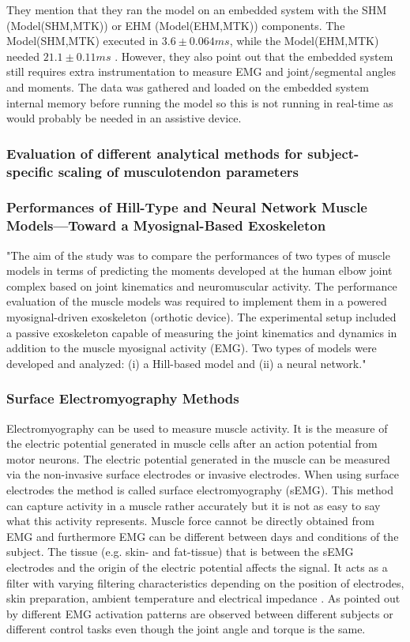They mention that they ran the model on an embedded system with the SHM (Model(SHM,MTK)) or EHM (Model(EHM,MTK)) components. 
The Model(SHM,MTK) executed in $3.6 \pm 0.064 ms$, while the Model(EHM,MTK) needed $21.1 \pm 0.11 ms$ \cite[p. 8]{Sartori2012}.
However, they also point out that the embedded system still requires extra instrumentation to measure EMG and joint/segmental angles and moments. The data was gathered and loaded on the embedded system internal memory before running the model so this is not running in real-time as would probably be needed in an assistive device.

\subsubsection{Evaluation of different analytical methods for subject-specific scaling of musculotendon parameters}

\subsubsection{Performances of Hill-Type and Neural Network Muscle
Models—Toward a Myosignal-Based Exoskeleton}

"The aim of the study was to compare the performances of two types of muscle models in terms of predicting the moments developed at the human elbow joint complex based on joint kinematics and neuromuscular activity. The performance evaluation of the muscle models was required to implement them in a powered myosignal-driven exoskeleton (orthotic device). The experimental setup included a passive exoskeleton capable of measuring the joint kinematics and dynamics in addition to the muscle myosignal activity (EMG). Two types of models were developed and analyzed: (i) a Hill-based model and (ii) a neural network." \cite[p. 1]{Rosen1999}

\subsubsection{Surface Electromyography Methods}
Electromyography can be used to measure muscle activity. 
It is the measure of the electric potential generated in muscle cells after an action potential from motor neurons. 
The electric potential generated in the muscle can be measured via the non-invasive surface electrodes or invasive electrodes. 
When using surface electrodes the method is called surface electromyography (sEMG). 
This method can capture activity in a muscle rather accurately but it is not as easy to say what this activity represents. 
Muscle force cannot be directly obtained from EMG and furthermore EMG can be different between days and conditions of the subject. 
The tissue (e.g. skin- and fat-tissue) that is between the sEMG electrodes and the origin of the electric potential affects the signal. 
It acts as a filter with varying filtering characteristics depending on the position of electrodes, skin preparation, ambient temperature and electrical impedance \cite{Lloyd2003}.  
As pointed out by \citeauthor{Lloyd2003} \cite{Lloyd2003} different EMG activation patterns are observed between different subjects or different control tasks even though the joint angle and torque is the same.

